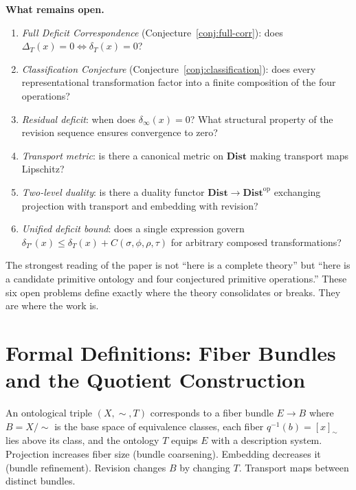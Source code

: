 \documentclass[12pt, a4paper]{article}
\theoremstyle{plain}
\theoremstyle{definition}
\theoremstyle{remark}
\begin{document}
\medskip
\noindent\textbf{What remains open.}

\begin{enumerate}[leftmargin=1.8em, label=(\arabic*)]
  \item \emph{Full Deficit Correspondence} (Conjecture~\ref{conj:full-corr}):
        does $\Delta_T(x)=0\iff\delta_T(x)=0$?
  \item \emph{Classification Conjecture} (Conjecture~\ref{conj:classification}):
        does every representational transformation factor into a finite
        composition of the four operations?
  \item \emph{Residual deficit}: when does $\delta_\infty(x)=0$? What
        structural property of the revision sequence ensures convergence to
        zero?
  \item \emph{Transport metric}: is there a canonical metric on $\mathbf{Dist}$
        making transport maps Lipschitz?
  \item \emph{Two-level duality}: is there a duality functor
        $\mathbf{Dist}\to\mathbf{Dist}^{\mathrm{op}}$ exchanging projection
        with transport and embedding with revision?
  \item \emph{Unified deficit bound}: does a single expression govern
        $\delta_{T'}(x)\le\delta_T(x)+C(\sigma,\phi,\rho,\tau)$ for arbitrary
        composed transformations?
\end{enumerate}

The strongest reading of the paper is not ``here is a complete theory''
but ``here is a candidate primitive ontology and four conjectured primitive
operations.'' These six open problems define exactly where the theory
consolidates or breaks. They are where the work is.

\appendix

\section{Formal Definitions: Fiber Bundles and the Quotient Construction}
\label{app:formal}

An ontological triple $(X,\sim,T)$ corresponds to a fiber bundle $E\to B$
where $B=X/{\sim}$ is the base space of equivalence classes, each fiber
$q^{-1}(b)=[x]_\sim$ lies above its class, and the ontology $T$ equips
$E$ with a description system. Projection increases fiber size (bundle
coarsening). Embedding decreases it (bundle refinement). Revision changes
$B$ by changing $T$. Transport maps between distinct bundles.
\end{document}
